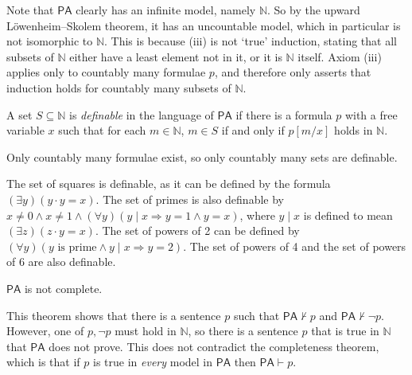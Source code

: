 Note that \( \mathsf{PA} \) clearly has an infinite model, namely \( \mathbb N \).
So by the upward L\"owenheim--Skolem theorem, it has an uncountable model, which in particular is not isomorphic to \( \mathbb N \).
This is because (iii) is not `true' induction, stating that all subsets of \( \mathbb N \) either have a least element not in it, or it is \( \mathbb N \) itself.
Axiom (iii) applies only to countably many formulae \( p \), and therefore only asserts that induction holds for countably many subsets of \( \mathbb N \).
\begin{definition}
    A set \( S \subseteq \mathbb N \) is \emph{definable} in the language of \( \mathsf{PA} \) if there is a formula \( p \) with a free variable \( x \) such that for each \( m \in \mathbb N \), \( m \in S \) if and only if \( p[m/x] \) holds in \( \mathbb N \).
\end{definition}
Only countably many formulae exist, so only countably many sets are definable.
\begin{example}
    The set of squares is definable, as it can be defined by the formula \( (\exists y)(y\cdot y = x) \).
    The set of primes is also definable by \( x \neq 0 \wedge x \neq 1 \wedge (\forall y)(y \mid x \Rightarrow y = 1 \wedge y = x) \), where \( y \mid x \) is defined to mean \( (\exists z)(z \cdot y = x) \).
    The set of powers of 2 can be defined by \( (\forall y)(y \text{ is prime} \wedge y \mid x \Rightarrow y = 2) \).
    The set of powers of 4 and the set of powers of 6 are also definable.
\end{example}
\begin{theorem}
    \( \mathsf{PA} \) is not complete.
\end{theorem}
This theorem shows that there is a sentence \( p \) such that \( \mathsf{PA} \not\vdash p \) and \( \mathsf{PA} \not\vdash \neg p \).
However, one of \( p, \neg p \) must hold in \( \mathbb N \), so there is a sentence \( p \) that is true in \( \mathbb N \) that \( \mathsf{PA} \) does not prove.
This does not contradict the completeness theorem, which is that if \( p \) is true in \emph{every} model in \( \mathsf{PA} \) then \( \mathsf{PA} \vdash p \).

